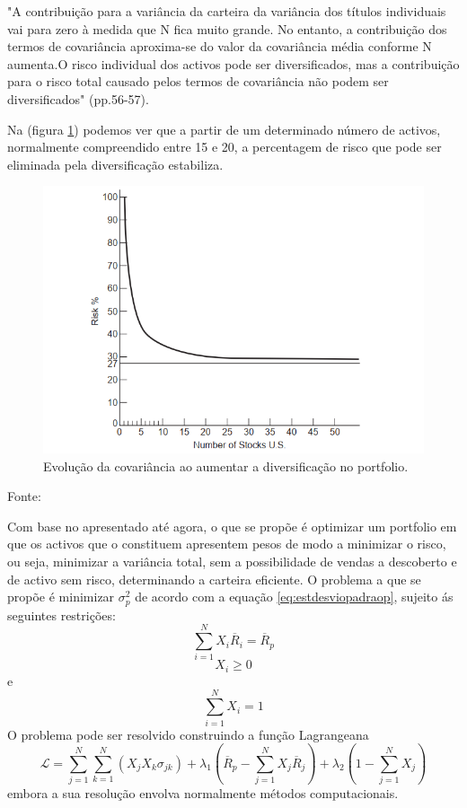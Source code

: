\documentclass[
  12pt,
  a4paper,
  openany]{book}
\begin{document}
\begin{spacing}{1}
\begin{adjustwidth}{28.3464pt}{28.3464pt}\footnotesize
"A contribuição para a variância da carteira da variância dos títulos individuais vai para zero à medida que N fica muito grande. No entanto, a contribuição dos termos de covariância aproxima-se do valor da covariância média conforme N aumenta.O risco individual dos activos pode ser diversificados, mas a contribuição para o risco total causado pelos termos de covariância não podem ser diversificados" (pp.56-57).
\normalsize\end{adjustwidth}
\end{spacing}
\medskip

Na (figura \ref{fig:covusa}) podemos ver que a partir de um determinado número de activos, normalmente compreendido entre 15 e 20, a percentagem de risco que pode ser eliminada pela diversificação estabiliza.



\begin{figure}

{\centering \includegraphics[width=0.6\linewidth]{image/covusa} 

}

\caption{Evolução da covariância ao aumentar a diversificação no portfolio.}\label{fig:covusa}
\end{figure}
\FloatBarrier
\centering

Fonte: \citep[pp.58]{Goetzmann2014}

\justifying
\bigskip

Com base no apresentado até agora, o que se propõe é optimizar um portfolio em que os activos que o constituem apresentem pesos de modo a minimizar o risco, ou seja, minimizar a variância total, sem a possibilidade de vendas a descoberto e de activo sem risco, determinando a carteira eficiente. O problema a que se propõe é minimizar \(\sigma_{p}^{2}\) de acordo com a equação \eqref{eq:estdesviopadraop}, sujeito ás seguintes restrições:
\begin{equation} 
  \sum_{i=1}^{N}X_{i}\overline{R}_{i}=\overline{R}_{p}
  \label{eq:und}
\end{equation}
\[X_{i}\geq0\] e \[\sum_{i=1}^{N}X_{i}=1\]
O problema pode ser resolvido construindo a função Lagrangeana
\begin{equation} 
  \mathcal{L} = \sum_{j=1}^{N}\sum_{k=1}^{N}(X_{j}X_{k}\sigma_{jk})+\lambda_{1}(\overline{R}_{p}-\sum_{j=1}^{N}X_{j}\overline{R}_{j})+\lambda_{2}(1-\sum_{j=1}^{N}X_{j})
  \label{eq:lagrangeana}
\end{equation}
embora a sua resolução envolva normalmente métodos computacionais.
\end{document}
